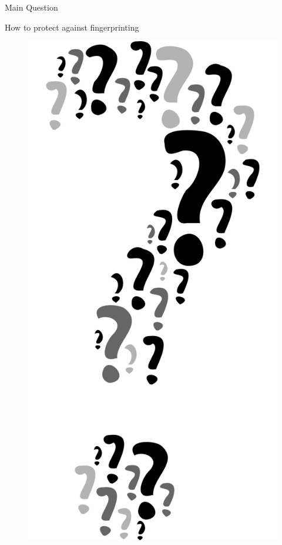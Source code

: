 \documentclass[aspectratio=169]{beamer}
[aspectratio=169] %
\begin{document}
\begin{frame}{Main Question}
  \begin{minipage}{0.525\textwidth} 
    How to protect against fingerprinting
  \end{minipage}
  \hfill
  \begin{minipage}{0.455\textwidth} 
    \begin{figure}
      \centering
      \includegraphics[height=0.5\textheight]{figures/question.png}
    \end{figure}
  \end{minipage}
\end{frame}
\end{document}
